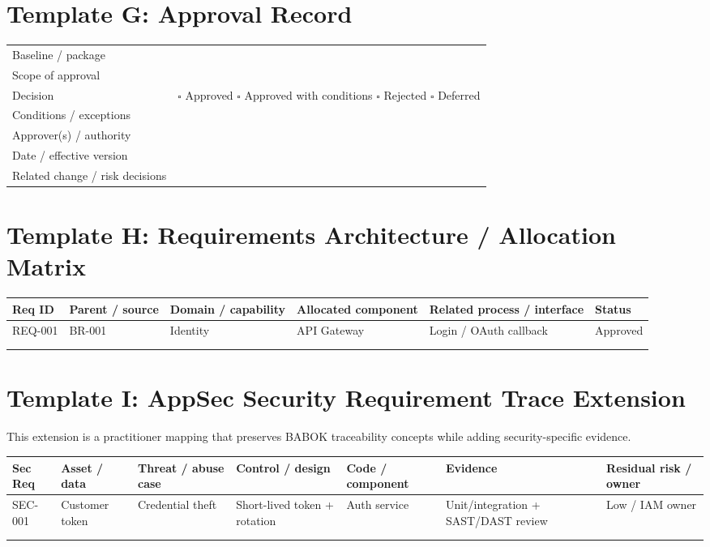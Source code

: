 \documentclass[11pt]{article}
\begin{document}
\section{Template G: Approval Record}
\begin{longtable}{L{0.26\textwidth} L{0.62\textwidth}}
\toprule
Baseline / package & \\
Scope of approval & \vspace{0.20in}\\
Decision & $\square$ Approved \quad $\square$ Approved with conditions \quad $\square$ Rejected \quad $\square$ Deferred\\
Conditions / exceptions & \vspace{0.28in}\\
Approver(s) / authority & \vspace{0.18in}\\
Date / effective version & \\
Related change / risk decisions & \vspace{0.20in}\\
\bottomrule
\end{longtable}
\section{Template H: Requirements Architecture / Allocation Matrix}
\small
\begin{longtable}{@{}L{0.12\textwidth} L{0.16\textwidth} L{0.16\textwidth} L{0.14\textwidth} L{0.16\textwidth} L{\tabcolsep\relax}@{}}
\toprule
Req ID & Parent / source & Domain / capability & Allocated component & Related process / interface & Status\\
\midrule
REQ-001 & BR-001 & Identity & API Gateway & Login / OAuth callback & Approved\\
 & & & & & \\
 & & & & & \\
\bottomrule
\end{longtable}
\normalsize
\section{Template I: AppSec Security Requirement Trace Extension}
This extension is a practitioner mapping that preserves BABOK traceability concepts while adding security-specific evidence.
\small
\begin{longtable}{@{}L{0.10\textwidth} L{0.12\textwidth} L{0.12\textwidth} L{0.13\textwidth} L{0.12\textwidth} L{0.15\textwidth} L{\tabcolsep\relax}@{}}
\toprule
Sec Req & Asset / data & Threat / abuse case & Control / design & Code / component & Evidence & Residual risk / owner\\
\midrule
SEC-001 & Customer token & Credential theft & Short-lived token + rotation & Auth service & Unit/\allowbreak integration + SAST/\allowbreak DAST review & Low / IAM owner\\
 & & & & & & \\
 & & & & & & \\
\bottomrule
\end{longtable}
\normalsize
\end{document}
